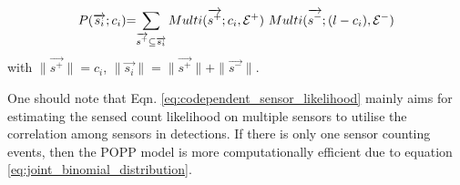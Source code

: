 \begin{equation}
	\label{eq:codependent_sensor_likelihood}
	\begin{tabular}{r@{=}l}
		$P(\overrightarrow{s_i} ; c_i)$ & $\displaystyle\sum_{\overrightarrow{s^+} \subseteq \overrightarrow{s_i}} Multi(\overrightarrow{s^+} ; c_i, \mathcal E^+) ~ Multi(\overrightarrow{s^-} ; (l - c_i), \mathcal E^-)$
	\end{tabular}
\end{equation}
\noindent with $\parallel \overrightarrow{s^+} \parallel = c_i$, $\parallel \overrightarrow{s_i} \parallel = \parallel \overrightarrow{s^+} \parallel + \parallel \overrightarrow{s^-} \parallel$.

One should note that Eqn. \ref{eq:codependent_sensor_likelihood} mainly aims for estimating the sensed count likelihood on multiple sensors to utilise the correlation among sensors in detections. If there is only one sensor counting events, then the POPP model is more computationally efficient due to equation \ref{eq:joint_binomial_distribution}.
